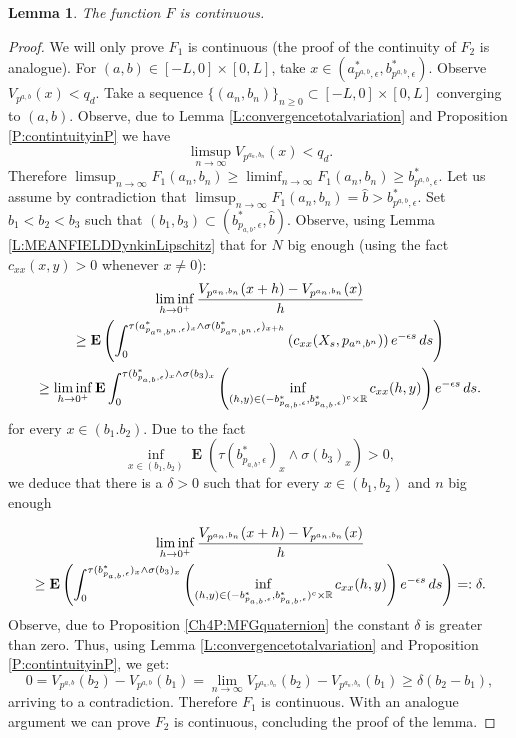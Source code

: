 \documentclass{article}
\newtheorem{lemma}[thm]{Lemma}
\newcommand\E{\operatorname{\mathbf{E}}}
\begin{document}
\begin{lemma}\label{CH4L:ContinuityDynkinsolution}
The function $F$ is continuous. 
\end{lemma}
\begin{proof}
We will only prove $F_1$ is continuous (the proof of the continuity of $F_2$ is analogue).
For $(a,b) \in [-L,0] \times [0,L] $, take $x \in (a^{\ast}_{p^{a,b},\epsilon},b^{\ast}_{p^{a,b},\epsilon})$. Observe $ V_{p^{a,b}}(x)< q_d$. Take a sequence $\lbrace (a_n , b_n) \rbrace_{n \geq 0} \subset [-L,0] \times [0,L] $ converging to $(a,b)$. Observe, due to Lemma \ref{L:convergencetotalvariation} and Proposition \ref{P:contintuityinP} we have
$$\limsup_{n  \to \infty} V_{p^{a_n,b_n}}(x)< q_d. $$
Therefore $\limsup_{n \to \infty} F_1(a_n,b_n) \geq \liminf_{n \to \infty} F_1(a_n,b_n) \geq  b^{\ast}_{p^{a,b},\epsilon}$. Let us assume by contradiction that  $\limsup_{n  \to \infty} F_1(a_n,b_n) =\hat{b} >  b^{\ast}_{p^{a,b},\epsilon}$.  Set $b_1<b_2<b_3 $ such that $(b_1,b_3) \subset (b^*_{p_{a,b},\epsilon},\hat{b})$. Observe, using Lemma \ref{L:MEANFIELDDynkinLipschitz} that for $N$ big enough (using the fact $c_{xx}(x,y)>0$ whenever $x \neq 0$):
\begin{multline*}
\liminf_{h \to 0^+}{V_{p^{a_n,b_n}}(x+h)-V_{p^{a_n,b_n}}(x)\over h} \\
\geq  \E \left( \int_0^{\tau(a^*_{p_{a^n,b^n},\epsilon})_{x}\wedge \sigma(b^*_{p_{a^n,b^n},\epsilon})_{x+h}}\left( c_{xx}(X_s,p_{a^n,b^n})  \right)e^{-\epsilon s}\,ds\right) \\
 \geq  \liminf_{h \to 0^+} \E\int_0^{\tau(b^*_{p_{a,b},\epsilon})_{x}\wedge \sigma(b_3)_{x}}\left(\inf_{(h,y)\in   (-b^*_{p_{a,b},\epsilon},b^*_{p_{a,b},\epsilon})^c \times \mathbb{R}} c_{xx}(h,y) \right)e^{-\epsilon s}\,ds.
\end{multline*}
for every $x \in (b_1.b_2)$. Due to the fact 
$$ \inf_{x \in (b_1,b_2)}\E(\tau(b^*_{p_{a,b},\epsilon})_{x}\wedge \sigma(b_3)_{x})>0, $$ we deduce that there is a $\delta>0$ such that for every $x \in (b_1,b_2)$ and $n$ big enough

\begin{multline}\label{eq:boundforderivatecontinuity}
\liminf_{h \to 0^+}{V_{p^{a_n,b_n}}(x+h)-V_{p^{a_n,b_n}}(x)\over h} 
\\ \geq  \E \left( \int_0^{\tau(b^*_{p_{a,b},\epsilon})_{x}\wedge \sigma(b_3)_{x}}\left(\inf_{(h,y)\in  (-b^*_{p_{a,b},\epsilon},b^*_{p_{a,b},\epsilon})^c \times \mathbb{R} } c_{xx}(h,y)  \right)e^{-\epsilon s}\,ds\right)=: \delta .
\end{multline}
Observe, due to Proposition \ref{Ch4P:MFGquaternion} the constant $\delta$ is greater than zero.
Thus, using Lemma \ref{L:convergencetotalvariation} and Proposition \ref{P:contintuityinP}, we get:
\begin{equation*}
0=V_{p^{a,b}}(b_2)-V_{p^{a,b}}(b_1)= \lim_{n \to \infty}V_{p^{a_n,b_n}}(b_2)-V_{p^{a_n,b_n}}(b_1) \geq \delta(b_2-b_1), 
\end{equation*}
arriving to a contradiction. Therefore $F_1$ is continuous. With an analogue argument we can prove $F_2$ is continuous, concluding the proof of the lemma.
\end{proof}
\end{document}
